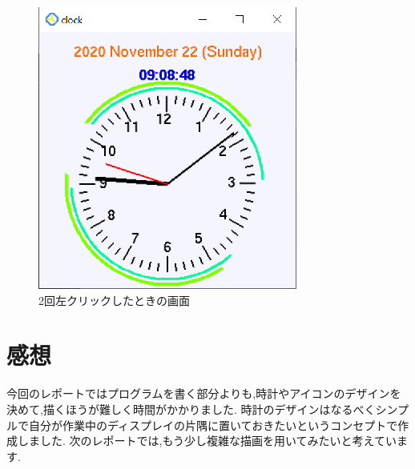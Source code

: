 \documentclass[a4j]{jarticle}
\begin{document}
          \begin{figure}[H]
            \centering
            \includegraphics[scale=1.1]{white2.eps}
            \caption{2回左クリックしたときの画面}
             \label{w2}
            \end{figure}

        \section{感想}
        今回のレポートではプログラムを書く部分よりも,時計やアイコンのデザインを決めて,描くほうが難しく時間がかかりました.
        時計のデザインはなるべくシンプルで自分が作業中のディスプレイの片隅に置いておきたいというコンセプトで作成しました.
        次のレポートでは,もう少し複雑な描画を用いてみたいと考えています.
        
\end{document}
